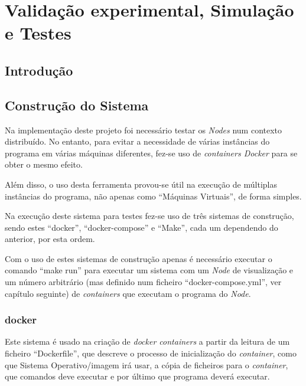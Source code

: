 \chapter{Validação experimental, Simulação e Testes}

\section{Introdução}
\label{chap5:sec:intro}

\section{Construção do Sistema}
\begin{comment}
- Explicação dos elementos do deploy - Makefile, Dockerfile, Docker-compose, 
> Explicar como funciona um Dockerfile
> "                         Dockercompose
> "             para que serve o Make.
- Explicar outra vez, mas resumidamente, a atualização da parte da visualização (não do estado no Node de visualização)
- Como dar deploy
\end{comment}

Na implementação deste projeto foi necessário testar os \emph{Nodes} num contexto distribuído.
No entanto, para evitar a necessidade de várias instâncias do programa em várias máquinas diferentes, fez-se uso de \emph{containers Docker} para se obter o mesmo efeito.

Além disso, o uso desta ferramenta provou-se útil na execução de múltiplas instâncias do programa, não apenas como ``Máquinas Virtuais'', de forma simples.

Na execução deste sistema para testes fez-se uso de três sistemas de construção, sendo estes ``docker'', ``docker-compose'' e ``Make'', cada um dependendo do anterior, por esta ordem.

Com o uso de estes sistemas de construção apenas é necessário executar o comando ``make run'' para executar um sistema com um \emph{Node} de visualização e um número arbitrário (mas definido num ficheiro ``docker-compose.yml'', ver capítulo seguinte) de \emph{containers} que executam o programa do \emph{Node}.



\subsection*{docker}
Este sistema é usado na criação de \emph{docker containers} a partir da leitura de um ficheiro ``Dockerfile'', que descreve o processo de inicialização do \emph{container}, como que Sistema Operativo/imagem irá usar, a cópia de ficheiros para o \emph{container}, que comandos deve executar e por último que programa deverá executar.


